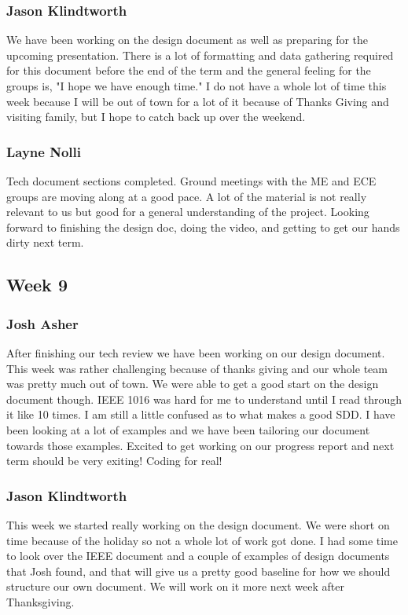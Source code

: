 \documentclass[10pt,draftclsnofoot,onecolumn]{IEEEtran}
\begin{document}
\subsubsection{Jason Klindtworth} We have been working on the design document as well as preparing for the upcoming presentation. There is a lot of formatting and data gathering required for this document before the end of the term and the general feeling for the groups is, "I hope we have enough time." I do not have a whole lot of time this week because I will be out of town for a lot of it because of Thanks Giving and visiting family, but I hope to catch back up over the weekend.

\subsubsection{Layne Nolli} Tech document sections completed. Ground meetings with the ME and ECE groups are moving along at a good pace. A lot of the material is not really relevant to us but good for a general understanding of the project. Looking forward to finishing the design doc, doing the video, and getting to get our hands dirty next term.

\subsection{Week 9}

\subsubsection{Josh Asher} After finishing our tech review we have been working on our design document. This week was rather challenging because of thanks giving and our whole team was pretty much out of town. We were able to get a good start on the design document though. IEEE 1016 was hard for me to understand until I read through it like 10 times. I am still a little confused as to what makes a good SDD. I have been looking at a lot of examples and we have been tailoring our document towards those examples. Excited to get working on our progress report and next term should be very exiting! Coding for real!

\subsubsection{Jason Klindtworth}
This week we started really working on the design document. We were short on time because of the holiday so not a whole lot of work got done. I had some time to look over the IEEE document and a couple of examples of design documents that Josh found, and that will give us a pretty good baseline for how we should structure our own document. We will work on it more next week after Thanksgiving.
\end{document}
